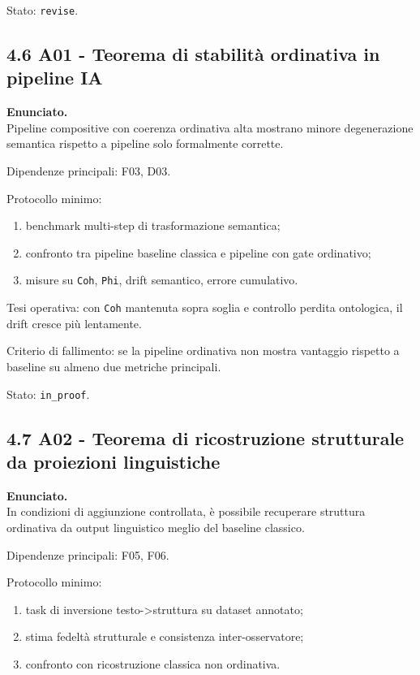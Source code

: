 Stato: \texttt{revise}.

\subsection{4.6 A01 - Teorema di stabilità ordinativa in pipeline IA}

\textbf{Enunciato.}\\
Pipeline compositive con coerenza ordinativa alta mostrano minore degenerazione semantica rispetto a pipeline solo formalmente corrette.

Dipendenze principali:
F03, D03.

Protocollo minimo:

\begin{enumerate}
\def\labelenumi{\arabic{enumi}.}
\tightlist
\item
  benchmark multi-step di trasformazione semantica;
\item
  confronto tra pipeline baseline classica e pipeline con gate ordinativo;
\item
  misure su \texttt{Coh}, \texttt{Phi}, drift semantico, errore cumulativo.
\end{enumerate}

Tesi operativa:
con \texttt{Coh} mantenuta sopra soglia e controllo perdita ontologica, il drift cresce più lentamente.

Criterio di fallimento:
se la pipeline ordinativa non mostra vantaggio rispetto a baseline su almeno due metriche principali.

Stato: \texttt{in\_proof}.

\subsection{4.7 A02 - Teorema di ricostruzione strutturale da proiezioni linguistiche}

\textbf{Enunciato.}\\
In condizioni di aggiunzione controllata, è possibile recuperare struttura ordinativa da output linguistico meglio del baseline classico.

Dipendenze principali:
F05, F06.

Protocollo minimo:

\begin{enumerate}
\def\labelenumi{\arabic{enumi}.}
\tightlist
\item
  task di inversione testo-\textgreater struttura su dataset annotato;
\item
  stima fedeltà strutturale e consistenza inter-osservatore;
\item
  confronto con ricostruzione classica non ordinativa.
\end{enumerate}

